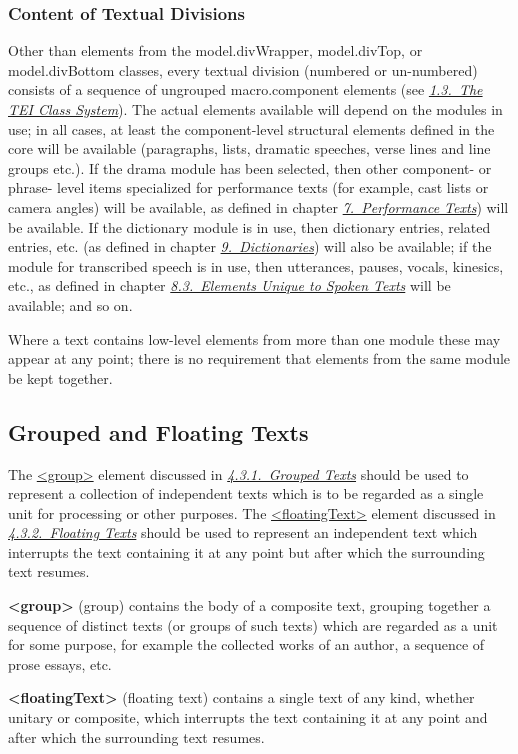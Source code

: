 \subsubsection[{Content of Textual Divisions}]{Content of Textual Divisions}\label{DSCO}\par
Other than elements from the \textsf{model.divWrapper}, \textsf{model.divTop}, or \textsf{model.divBottom} classes, every textual division (numbered or un-numbered) consists of a sequence of ungrouped \textsf{macro.component} elements (see \textit{\hyperref[STEC]{1.3.\ The TEI Class System}}). The actual elements available will depend on the modules in use; in all cases, at least the component-level structural elements defined in the core will be available (paragraphs, lists, dramatic speeches, verse lines and line groups etc.). If the drama module has been selected, then other component- or phrase- level items specialized for performance texts (for example, cast lists or camera angles) will be available, as defined in chapter \textit{\hyperref[DR]{7.\ Performance Texts}}) will be available. If the dictionary module is in use, then dictionary entries, related entries, etc. (as defined in chapter \textit{\hyperref[DI]{9.\ Dictionaries}}) will also be available; if the module for transcribed speech is in use, then utterances, pauses, vocals, kinesics, etc., as defined in chapter \textit{\hyperref[TSBA]{8.3.\ Elements Unique to Spoken Texts}} will be available; and so on.\par
Where a text contains low-level elements from more than one module these may appear at any point; there is no requirement that elements from the same module be kept together.
\subsection[{Grouped and Floating Texts}]{Grouped and Floating Texts}\label{DSGRPF}\par
The \hyperref[TEI.group]{<group>} element discussed in \textit{\hyperref[DSGRP]{4.3.1.\ Grouped Texts}} should be used to represent a collection of independent texts which is to be regarded as a single unit for processing or other purposes. The \hyperref[TEI.floatingText]{<floatingText>} element discussed in \textit{\hyperref[DSFLT]{4.3.2.\ Floating Texts}} should be used to represent an independent text which interrupts the text containing it at any point but after which the surrounding text resumes. 
\begin{sansreflist}
  
\item [\textbf{<group>}] (group) contains the body of a composite text, grouping together a sequence of distinct texts (or groups of such texts) which are regarded as a unit for some purpose, for example the collected works of an author, a sequence of prose essays, etc.
\item [\textbf{<floatingText>}] (floating text) contains a single text of any kind, whether unitary or composite, which interrupts the text containing it at any point and after which the surrounding text resumes.
\end{sansreflist}

